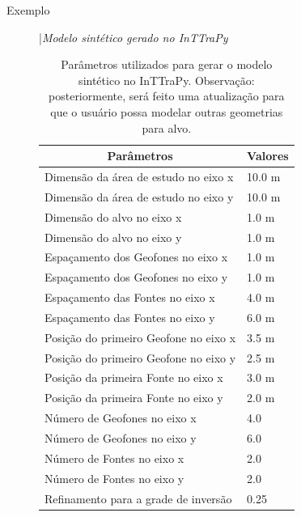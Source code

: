 \documentclass[a4paper, 12 pt]{article} %
\begin{document}
\begin{description}
	\item[Exemplo] |\textit{Modelo sintético gerado no InTTraPy} 
	
	\hspace{0.5cm} \blindtext 
	
	\begin{table}[!hbtp]
		\caption{Parâmetros utilizados para gerar o modelo sintético no InTTraPy. Observação: posteriormente, será feito uma atualização para que o usuário possa modelar outras geometrias para alvo.}
		\centering
		\label{parametros_dado_sintetico}
		\begin{tabular}{@{}ll@{}}
			\toprule
			\multicolumn{1}{c}{Parâmetros} &  
			\multicolumn{1}{c}{Valores}       \\ \midrule
			\rowcolor[HTML]{EFEFEF} 
			Dimensão da área de estudo no eixo x   
			&  10.0 m \\
			Dimensão da área de estudo no eixo y    
			&  10.0  m \\
			\rowcolor[HTML]{EFEFEF} 
			Dimensão do alvo no eixo x         
			&   1.0  m  \\
			Dimensão do alvo no eixo y          
			&    1.0 m   \\
			\rowcolor[HTML]{EFEFEF} 
			Espaçamento dos Geofones no eixo x 
			&  1.0 m  \\
			Espaçamento dos Geofones no eixo y         
			&   1.0 m   \\
			\rowcolor[HTML]{EFEFEF} 
			Espaçamento das Fontes no eixo x    
			&    4.0  m 	\\
			Espaçamento das Fontes no eixo y           
			&    6.0 m      \\
			\rowcolor[HTML]{EFEFEF} 
			Posição do primeiro Geofone no eixo x     
			&    3.5 m       \\
			Posição do primeiro Geofone no eixo y
		    &    2.5 m      \\
			\rowcolor[HTML]{EFEFEF} 
			Posição da primeira Fonte no eixo x    
			&     3.0 m   \\
			Posição da primeira Fonte no eixo y        
			&  2.0 m     \\
			\rowcolor[HTML]{EFEFEF} 
			Número de Geofones no eixo x     
			&    4.0   	\\
			Número de Geofones no eixo y
			&    6.0     \\
			\rowcolor[HTML]{EFEFEF} 
			Número de Fontes no eixo x     
			&    2.0    \\
			Número de Fontes no eixo y
			&    2.0    \\
			\rowcolor[HTML]{EFEFEF} 
			Refinamento para a grade de inversão     
			&     0.25              
			

\end{tabular}
\end{table}
\end{description}
\end{document}
